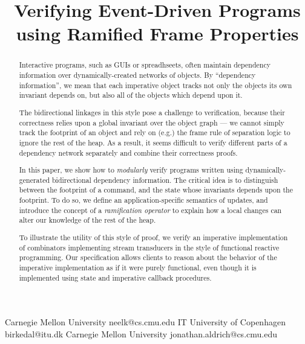 \documentclass[preprint,natbib]{sigplanconf}
\begin{document}
\copyrightdata{[to be supplied]} 


\title{Verifying Event-Driven Programs using Ramified Frame Properties}

           {Carnegie Mellon University}
           {neelk@cs.cmu.edu}
           {IT University of Copenhagen}
           {birkedal@itu.dk}
           {Carnegie Mellon University}
           {jonathan.aldrich@cs.cmu.edu}
\maketitle

\begin{abstract}
Interactive programs, such as GUIs or spreadhseets, often maintain
dependency information over dynamically-created networks of objects.
By ``dependency information'', we mean that each imperative object
tracks not only the objects its own invariant depends on, but also all
of the objects which depend upon it.

The bidirectional linkages in this style pose a challenge to
verification, because their correctness relies upon a global invariant
over the object graph --- we cannot simply track the footprint of an
object and rely on (e.g.) the frame rule of separation logic to ignore
the rest of the heap. As a result, it seems difficult to verify
different parts of a dependency network separately and combine their
correctness proofs.

In this paper, we show how to \emph{modularly} verify programs written
using dynamically-generated bidirectional dependency information. The
critical idea is to distinguish between the footprint of a command,
and the state whose invariants depends upon the footprint. To do so,
we define an application-specific semantics of updates, and introduce
the concept of a \emph{ramification operator} to explain how a local
changes can alter our knowledge of the rest of the heap.

To illustrate the utility of this style of proof, we verify an
imperative implementation of combinators implementing stream
transducers in the style of functional reactive programming. Our
specification allows clients to reason about the behavior of the
imperative implementation as if it were purely functional, even though
it is implemented using state and imperative callback procedures.
\end{abstract}
\end{document}
